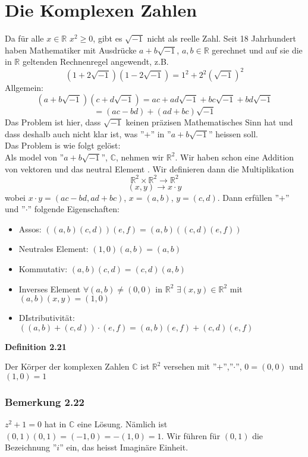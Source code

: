 \section{Die Komplexen Zahlen}
Da für alle $x\in\mathbb{R}$ $x^2\geq 0$, gibt es $\sqrt{-1}$ nicht als reelle Zahl. Seit 18 Jahrhundert haben Mathematiker mit Ausdrücke $a+b\sqrt{-1}$, $a,b\in\mathbb{R}$ gerechnet und auf sie die in $\mathbb{R}$ geltenden Rechnenregel angewendt, z.B. $$\left( 1+2\sqrt{-1}\right)\left( 1-2\sqrt{-1}\right) = 1^2 + 2^2\left( \sqrt{-1}\right)^2$$
Allgemein:
$$\left( a+b\sqrt{-1} \right)\left( c+d\sqrt{-1}\right) = ac + ad\sqrt{-1} + bc\sqrt{-1}+bd\sqrt{-1}$$
$$=\left( ac-bd\right)+\left(ad+bc\right)\sqrt{-1}$$
Das Problem ist hier, dass $\sqrt{-1}$ keinen präzisen Mathematisches Sinn hat und dass deshalb auch nicht klar ist, was ''$+$'' in ''$a+b\sqrt{-1}$'' heissen soll. \\

\noindent Das Problem is wie folgt gelöst:\\

Als model von ''$a+b\sqrt{-1}$'', $\mathbb{C}$, nehmen wir $\mathbb{R}^2$. Wir haben schon eine Addition von vektoren und das neutral Element . Wir definieren dann die Multiplikation $$\mathbb{R}^2 \times\mathbb{R}^2 \rightarrow \mathbb{R}^2$$ $$(x,y)\rightarrow x\cdot y $$
wobei $x\cdot y=(ac-bd,ad+bc)$, $x=(a,b)$, $y=(c,d)$. Dann erfüllen ''$+$'' und ''$\cdot$'' folgende Eigenschaften:
\begin{itemize}
\item Assos: $\left((a,b)(c,d)\right)(e,f)=(a,b)\left((c,d)(e,f) \right)$
\item Neutrales Element: $(1,0)(a,b)=(a,b)$
\item Kommutativ: $(a,b)(c,d)=(c,d)(a,b)$
\item Inverses Element $\forall (a,b)\not = (0,0)$ in $\mathbb{R}^2$ $\exists(x,y)\in\mathbb{R}^2$ mit $(a,b)(x,y)=(1,0)$
\item DIstributivität: $\left( (a,b)+(c,d)\right)\cdot (e,f)=(a,b)(e,f)+(c,d)(e,f)$
\end{itemize}

\begin{framed}
\centerline{\textbf{Definition 2.21}}
\noindent Der Körper der komplexen Zahlen $\mathbb{C}$ ist $\mathbb{R}^2$ versehen mit ''$+$'',''$\cdot$'', $0=(0,0)$ und $(1,0)=1$
\end{framed}

\subsubsection*{Bemerkung 2.22}
$z^2+1=0$ hat in $\mathbb{C}$ eine Lösung. Nämlich ist $(0,1)(0,1)=(-1,0)=-(1,0)=1$. Wir führen für $(0,1)$ die Bezeichnung ''$i$'' ein, das heisst Imaginäre Einheit.\\

